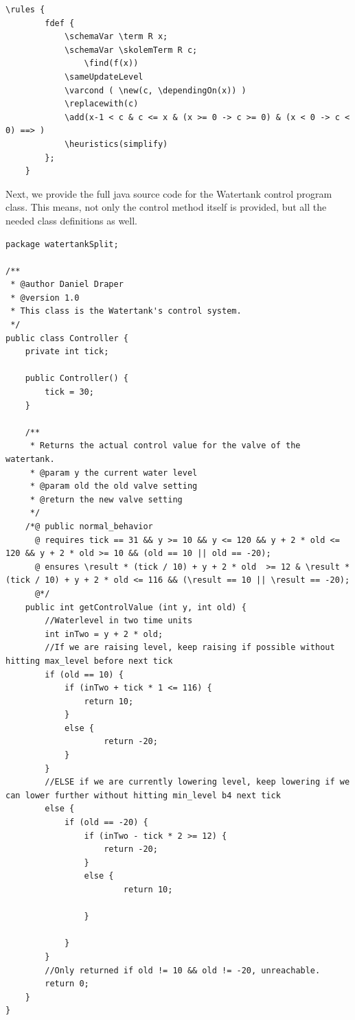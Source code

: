 \begin{lstlisting}[label=app:lst:ruleF]
	\rules {
 	 	fdef {
			\schemaVar \term R x;
			\schemaVar \skolemTerm R c;
    			\find(f(x))
			\sameUpdateLevel
			\varcond ( \new(c, \dependingOn(x)) )
			\replacewith(c)
			\add(x-1 < c & c <= x & (x >= 0 -> c >= 0) & (x < 0 -> c < 0) ==> )
			\heuristics(simplify)
		};
	}	
\end{lstlisting}

Next, we provide the full java source code for the Watertank control program class. This means, not only the control method itself is provided, but all the needed class definitions as well.

\begin{lstlisting}[label=app:lst:watertankContr]
package watertankSplit;

/**
 * @author Daniel Draper
 * @version 1.0
 * This class is the Watertank's control system.
 */
public class Controller {
	private int tick;
	
	public Controller() {
		tick = 30;
	}
	
	/**
	 * Returns the actual control value for the valve of the watertank.
	 * @param y the current water level
	 * @param old the old valve setting
	 * @return the new valve setting
	 */
	/*@ public normal_behavior
	  @ requires tick == 31 && y >= 10 && y <= 120 && y + 2 * old <= 120 && y + 2 * old >= 10 && (old == 10 || old == -20);
	  @ ensures \result * (tick / 10) + y + 2 * old  >= 12 & \result * (tick / 10) + y + 2 * old <= 116 && (\result == 10 || \result == -20);
	  @*/
	public int getControlValue (int y, int old) {
		//Waterlevel in two time units
		int inTwo = y + 2 * old;
		//If we are raising level, keep raising if possible without hitting max_level before next tick
		if (old == 10) {
			if (inTwo + tick * 1 <= 116) {
				return 10;
			}
			else {
					return -20;
			}
		}
		//ELSE if we are currently lowering level, keep lowering if we can lower further without hitting min_level b4 next tick
		else {
			if (old == -20) {
				if (inTwo - tick * 2 >= 12) {
					return -20;
				}
				else {
						return 10;
				
				}
		
			}
		}
		//Only returned if old != 10 && old != -20, unreachable.
		return 0;
	}
}
\end{lstlisting}

